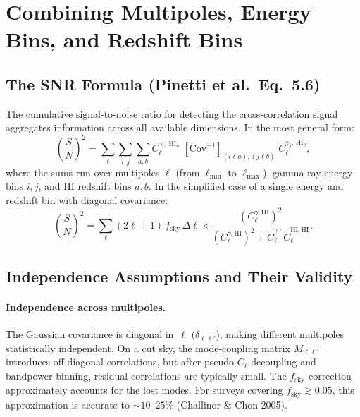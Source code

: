 \documentclass[10pt,a4paper]{article}
\newcommand{\Cl}{C_\ell}
\newcommand{\fsky}{f_{\mathrm{sky}}}
\newcommand{\Dl}{\Delta\ell}
\begin{document}
\section{Combining Multipoles, Energy Bins, and Redshift Bins}
\label{sec:snr}

\subsection{The SNR Formula (Pinetti et al.\ Eq.~5.6)}

The cumulative signal-to-noise ratio for detecting the cross-correlation signal aggregates information across all available dimensions. In the most general form:
\begin{equation}
\left(\frac{S}{N}\right)^2
= \sum_\ell \sum_{i,j} \sum_{a,b}
C_\ell^{\gamma_i,\, \mathrm{HI}_a}\;
\left[\mathrm{Cov}^{-1}\right]_{(i\ell a),(j\ell b)}\;
C_\ell^{\gamma_j,\, \mathrm{HI}_b},
\label{eq:snr_general}
\end{equation}
where the sums run over multipoles $\ell$ (from $\ell_{\min}$ to $\ell_{\max}$), gamma-ray energy bins $i,j$, and HI redshift bins $a,b$. In the simplified case of a single energy and redshift bin with diagonal covariance:
\begin{equation}
\left(\frac{S}{N}\right)^2
= \sum_\ell (2\ell+1)\, \fsky\, \Dl
\times \frac{(\Cl^{\gamma,\mathrm{HI}})^2}
{(\Cl^{\gamma,\mathrm{HI}})^2 + \tilde{C}_\ell^{\gamma\gamma}\, \tilde{C}_\ell^{\mathrm{HI,HI}}}.
\label{eq:snr_simple}
\end{equation}


\subsection{Independence Assumptions and Their Validity}

\paragraph{Independence across multipoles.}
The Gaussian covariance is diagonal in~$\ell$ ($\delta_{\ell\ell'}$), making different multipoles statistically independent. On a cut sky, the mode-coupling matrix $M_{\ell\ell'}$ introduces off-diagonal correlations, but after pseudo-$\Cl$ decoupling and bandpower binning, residual correlations are typically small. The $\fsky$ correction approximately accounts for the lost modes. For surveys covering $\fsky \gtrsim 0.05$, this approximation is accurate to $\sim 10$--$25\%$ (Challinor \& Chon 2005).
\end{document}
